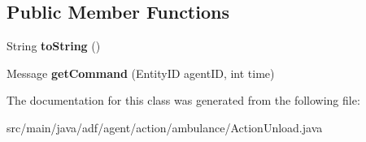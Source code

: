 \subsection*{Public Member Functions}
\begin{DoxyCompactItemize}
\item 
\hypertarget{classadf_1_1agent_1_1action_1_1ambulance_1_1ActionUnload_ab0181f67b851733bf8246a5265d1d534}{}\label{classadf_1_1agent_1_1action_1_1ambulance_1_1ActionUnload_ab0181f67b851733bf8246a5265d1d534} 
String {\bfseries to\+String} ()
\item 
\hypertarget{classadf_1_1agent_1_1action_1_1ambulance_1_1ActionUnload_aa8d8c9133d2196a3f886e1a87af7ba7a}{}\label{classadf_1_1agent_1_1action_1_1ambulance_1_1ActionUnload_aa8d8c9133d2196a3f886e1a87af7ba7a} 
Message {\bfseries get\+Command} (Entity\+ID agent\+ID, int time)
\end{DoxyCompactItemize}


The documentation for this class was generated from the following file\+:\begin{DoxyCompactItemize}
\item 
src/main/java/adf/agent/action/ambulance/Action\+Unload.\+java\end{DoxyCompactItemize}
